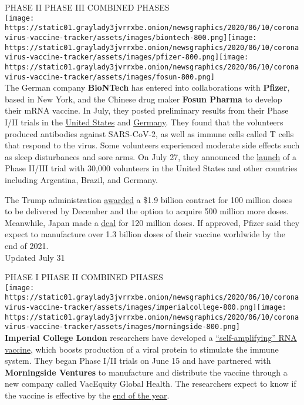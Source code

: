PHASE II PHASE III COMBINED PHASES\\
\texttt{[image: https://static01.graylady3jvrrxbe.onion/newsgraphics/2020/06/10/coronavirus-vaccine-tracker/assets/images/biontech-800.png]}\texttt{[image: https://static01.graylady3jvrrxbe.onion/newsgraphics/2020/06/10/coronavirus-vaccine-tracker/assets/images/pfizer-800.png]}\texttt{[image: https://static01.graylady3jvrrxbe.onion/newsgraphics/2020/06/10/coronavirus-vaccine-tracker/assets/images/fosun-800.png]}\\
The German company \textbf{BioNTech} has entered into collaborations
with \textbf{Pfizer}, based in New York, and the Chinese drug maker
\textbf{Fosun Pharma} to develop their mRNA vaccine. In July, they
posted preliminary results from their Phase I/II trials in the
\href{https://www.medrxiv.org/content/10.1101/2020.06.30.20142570v1}{United
States} and
\href{https://www.medrxiv.org/content/10.1101/2020.07.17.20140533v1}{Germany}.
They found that the volunteers produced antibodies against SARS-CoV-2,
as well as immune cells called T cells that respond to the virus. Some
volunteers experienced moderate side effects such as sleep disturbances
and sore arms. On July 27, they announced the
\href{https://www.businesswire.com/news/home/20200727005800/en/Pfizer-BioNTech-Choose-Lead-mRNA-Vaccine-Candidate}{launch}
of a Phase II/III trial with 30,000 volunteers in the United States and
other countries including Argentina, Brazil, and Germany.

The Trump administration
\href{https://www.nytimes3xbfgragh.onion/2020/07/22/us/politics/pfizer-coronavirus-vaccine.html}{awarded}
a \$1.9 billion contract for 100 million doses to be delivered by
December and the option to acquire 500 million more doses. Meanwhile,
Japan made a
\href{https://www.pfizer.com/news/press-release/press-release-detail/pfizer-and-biontech-supply-japan-120-million-doses-their}{deal}
for 120 million doses. If approved, Pfizer said they expect to
manufacture over 1.3 billion doses of their vaccine worldwide by the end
of 2021.\\
Updated July 31

PHASE I PHASE II COMBINED PHASES\\
\texttt{[image: https://static01.graylady3jvrrxbe.onion/newsgraphics/2020/06/10/coronavirus-vaccine-tracker/assets/images/imperialcollege-800.png]}\texttt{[image: https://static01.graylady3jvrrxbe.onion/newsgraphics/2020/06/10/coronavirus-vaccine-tracker/assets/images/morningside-800.png]}\\
\textbf{Imperial College London} researchers have developed a
\href{https://www.nytimes3xbfgragh.onion/2020/06/07/world/europe/imperial-college-uk-vaccine-coronavirus.html}{``self-amplifying''
RNA vaccine}, which boosts production of a viral protein to stimulate
the immune system. They began Phase I/II trials on June 15 and have
partnered with \textbf{Morningside Ventures} to manufacture and
distribute the vaccine through a new company called VacEquity Global
Health. The researchers expect to know if the vaccine is effective by
the
\href{https://www.theguardian.com/society/2020/jul/03/im-cautiously-optimistic-imperials-robin-shattock-on-his-coronavirus-vaccine}{end
of the year}.

